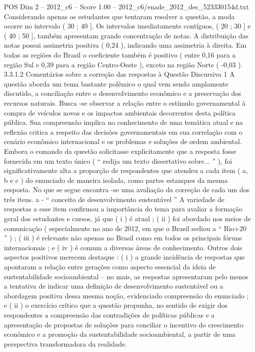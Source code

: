 \begin{textsample}{POS Dim 2 – 2012\_c6 – Score 1.00 – 2012\_c6/enade\_2012\_des\_523330154d.txt}
Considerando apenas os estudantes que tentaram resolver a questão, a moda ocorre no intervalo ( 30 ; 40 ].
Os intervalos imediatamente contíguos, ( 20 ; 30 ] e ( 40 ; 50 ], também apresentam grande concentração de notas.
A distribuição das notas possui assimetria positiva ( 0,24 ), indicando uma assimetria à direita.
Em todas as regiões do Brasil o coeficiente também é positivo ( entre 0,16 para a região Sul e 0,39 para a região Centro-Oeste ), exceto na região Norte ( -0,03 ). 3.3.1.2 Comentários sobre a correção das respostas à Questão Discursiva 1 A questão aborda um tema bastante polêmico o qual vem sendo amplamente discutido, a conciliação entre o desenvolvimento econômico e a preservação dos recursos naturais.
Busca -se observar a relação entre o estímulo governamental à compra de veículos novos e os impactos ambientais decorrentes desta política pública.
Sua compreensão implica no conhecimento de uma temática atual e na reflexão critica a respeito das decisões governamentais em sua correlação com o cenário econômico internacional e os problemas e soluções de ordem ambiental.
Embora o comando da questão solicitasse explicitamente que a resposta fosse fornecida em um texto único ( “ redija um texto dissertativo sobre... ” ), foi significativamente alta a proporção de respondentes que atendeu a cada item ( a, b e c ) do enunciado de maneira isolada, como partes estanques da mesma resposta.
No que se segue encontra -se uma avaliação da correção de cada um dos três itens. a - “ conceito de desenvolvimento sustentável ” A variedade de respostas a esse item confirmou a importância do tema para avaliar a formação geral dos estudantes e cursos, já que ( i ) é atual ; ( ii ) foi abordado nos meios de comunicação ( especialmente no ano de 2012, em que o Brasil sediou a “ Rio+20 ” ) ; ( iii ) é relevante não apenas no Brasil como em todos os principais fóruns internacionais ; e ( iv ) é comum a diversas áreas de conhecimento.
Outros dois aspectos positivos merecem destaque : ( i ) a grande incidência de respostas que apontaram a relação entre gerações como aspecto essencial da ideia de sustentabilidade socioambiental – no mais, as respostas apresentaram pelo menos a tentativa de indicar uma definição de desenvolvimento sustentável ou a abordagem positiva dessa mesma noção, evidenciado compreensão do enunciado ; e ( ii ) o exercício crítico que a questão propunha, no sentido de exigir dos respondentes a compreensão das contradições de políticas públicas e a apresentação de propostas de soluções para conciliar o incentivo do crescimento econômico e a promoção da sustentabilidade socioambiental, a partir de uma perspectiva transformadora da realidade.

\end{textsample}
